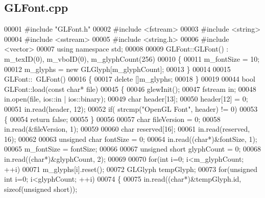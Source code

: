 \subsection{G\+L\+Font.\+cpp}
\label{GLFont_8cpp_source}

\begin{DoxyCode}
00001 \textcolor{preprocessor}{#include "GLFont.h"}
00002 \textcolor{preprocessor}{#include <fstream>}
00003 \textcolor{preprocessor}{#include <string>}
00004 \textcolor{preprocessor}{#include <sstream>}
00005 \textcolor{preprocessor}{#include <string.h>}
00006 \textcolor{preprocessor}{#include <vector>}
00007 \textcolor{keyword}{using namespace }std;
00008 
00009 GLFont::GLFont() : m\_texID(0), m\_vboID(0), m\_glyphCount(256)
00010 \{
00011     m_fontSize = 10;
00012     m_glyphs = \textcolor{keyword}{new} GLGlyph[m_glyphCount];
00013 \}
00014 
00015 GLFont::~GLFont()
00016 \{
00017     \textcolor{keyword}{delete} []m_glyphs;
00018 \}
00019 
00044 \textcolor{keywordtype}{bool} GLFont::load(\textcolor{keyword}{const} \textcolor{keywordtype}{char}* file)
00045 \{
00046     glewInit();
00047     fstream in;
00048     in.open(file, ios::in | ios::binary);
00049     \textcolor{keywordtype}{char} header[13];
00050     header[12] = 0;
00051     in.read(header, 12);
00052     \textcolor{keywordflow}{if}( strcmp(\textcolor{stringliteral}{"OpenGL Font"}, header) != 0)
00053     \{
00054         \textcolor{keywordflow}{return} \textcolor{keyword}{false};
00055     \}
00056 
00057     \textcolor{keywordtype}{char} fileVersion = 0;
00058     in.read(&fileVersion, 1);
00059 
00060     \textcolor{keywordtype}{char} reserved[16];
00061     in.read(reserved, 16);
00062 
00063     \textcolor{keywordtype}{unsigned} \textcolor{keywordtype}{char} fontSize = 0;
00064     in.read((\textcolor{keywordtype}{char}*)&fontSize, 1);
00065     m_fontSize = fontSize;
00066 
00067     \textcolor{keywordtype}{unsigned} \textcolor{keywordtype}{short} glyphCount = 0;
00068     in.read((\textcolor{keywordtype}{char}*)&glyphCount, 2);
00069 
00070     \textcolor{keywordflow}{for}(\textcolor{keywordtype}{int} i=0; i<m_glyphCount; ++i)
00071         m_glyphs[i].reset();
00072     GLGlyph tempGlyph;
00073     \textcolor{keywordflow}{for}(\textcolor{keywordtype}{unsigned} \textcolor{keywordtype}{int} i=0; i<glyphCount; ++i)
00074     \{
00075         in.read((\textcolor{keywordtype}{char}*)&tempGlyph.id, \textcolor{keyword}{sizeof}(\textcolor{keywordtype}{unsigned} \textcolor{keywordtype}{short}));

\end{DoxyCode}
